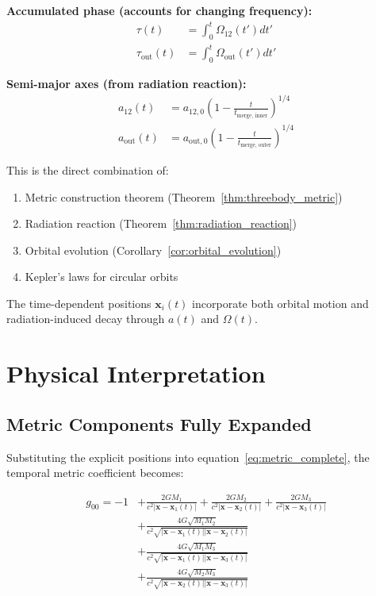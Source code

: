 \documentclass[11pt,a4paper]{article}
\theoremstyle{definition}
\theoremstyle{remark}
\begin{document}
		\textbf{Accumulated phase (accounts for changing frequency):}
		\begin{align}
			\tau(t) &= \int_0^t \Omega_{12}(t')dt' \label{eq:tau_inner}\\
			\tau_{\text{out}}(t) &= \int_0^t \Omega_{\text{out}}(t')dt' \label{eq:tau_outer}
		\end{align}
		
		\textbf{Semi-major axes (from radiation reaction):}
		\begin{align}
			a_{12}(t) &= a_{12,0}\left(1 - \frac{t}{t_{\text{merge, inner}}}\right)^{1/4} \label{eq:a12_evolution}\\
			a_{\text{out}}(t) &= a_{\text{out},0}\left(1 - \frac{t}{t_{\text{merge, outer}}}\right)^{1/4} \label{eq:aout_evolution}
		\end{align}
	
		This is the direct combination of:
		\begin{enumerate}
			\item Metric construction theorem (Theorem~\ref{thm:threebody_metric})
			\item Radiation reaction (Theorem~\ref{thm:radiation_reaction})
			\item Orbital evolution (Corollary~\ref{cor:orbital_evolution})
			\item Kepler's laws for circular orbits
		\end{enumerate}
		
		The time-dependent positions $\mathbf{x}_i(t)$ incorporate both orbital motion and radiation-induced decay through $a(t)$ and $\Omega(t)$.
	
	\section{Physical Interpretation}
	
	\subsection{Metric Components Fully Expanded}
	
	Substituting the explicit positions into equation~\eqref{eq:metric_complete}, the temporal metric coefficient becomes:
	
	\begin{equation}\label{eq:g00_explicit}
		\begin{aligned}
			g_{00} = -1 &+ \frac{2GM_1}{c^2|\mathbf{x}-\mathbf{x}_1(t)|} + \frac{2GM_2}{c^2|\mathbf{x}-\mathbf{x}_2(t)|} + \frac{2GM_3}{c^2|\mathbf{x}-\mathbf{x}_3(t)|} \\
			&+ \frac{4G\sqrt{M_1M_2}}{c^2\sqrt{|\mathbf{x}-\mathbf{x}_1(t)||\mathbf{x}-\mathbf{x}_2(t)|}} \\
			&+ \frac{4G\sqrt{M_1M_3}}{c^2\sqrt{|\mathbf{x}-\mathbf{x}_1(t)||\mathbf{x}-\mathbf{x}_3(t)|}} \\
			&+ \frac{4G\sqrt{M_2M_3}}{c^2\sqrt{|\mathbf{x}-\mathbf{x}_2(t)||\mathbf{x}-\mathbf{x}_3(t)|}}
		\end{aligned}
	\end{equation}
	
\end{document}
